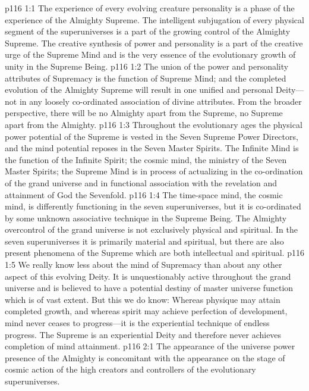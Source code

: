 \vs p116 1:1 The experience of every evolving creature personality is a phase of the experience of the Almighty Supreme. The intelligent subjugation of every physical segment of the superuniverses is a part of the growing control of the Almighty Supreme. The creative synthesis of power and personality is a part of the creative urge of the Supreme Mind and is the very essence of the evolutionary growth of unity in the Supreme Being.
\vs p116 1:2 The union of the power and personality attributes of Supremacy is the function of Supreme Mind; and the completed evolution of the Almighty Supreme will result in one unified and personal Deity---not in any loosely co\hyp{}ordinated association of divine attributes. From the broader perspective, there will be no Almighty apart from the Supreme, no Supreme apart from the Almighty.
\vs p116 1:3 Throughout the evolutionary ages the physical power potential of the Supreme is vested in the Seven Supreme Power Directors, and the mind potential reposes in the Seven Master Spirits. The Infinite Mind is the function of the Infinite Spirit; the cosmic mind, the ministry of the Seven Master Spirits; the Supreme Mind is in process of actualizing in the co\hyp{}ordination of the grand universe and in functional association with the revelation and attainment of God the Sevenfold.
\pc \vs p116 1:4 The time\hyp{}space mind, the cosmic mind, is differently functioning in the seven superuniverses, but it is co\hyp{}ordinated by some unknown associative technique in the Supreme Being. The Almighty overcontrol of the grand universe is not exclusively physical and spiritual. In the seven superuniverses it is primarily material and spiritual, but there are also present phenomena of the Supreme which are both intellectual and spiritual.
\vs p116 1:5 We really know less about the mind of Supremacy than about any other aspect of this evolving Deity. It is unquestionably active throughout the grand universe and is believed to have a potential destiny of master universe function which is of vast extent. But this we do know: Whereas physique may attain completed growth, and whereas spirit may achieve perfection of development, mind never ceases to progress---it is the experiential technique of endless progress. The Supreme is an experiential Deity and therefore never achieves completion of mind attainment.\plusone
{}
\vs p116 2:1 The appearance of the universe power presence of the Almighty is concomitant with the appearance on the stage of cosmic action of the high creators and controllers of the evolutionary superuniverses.

